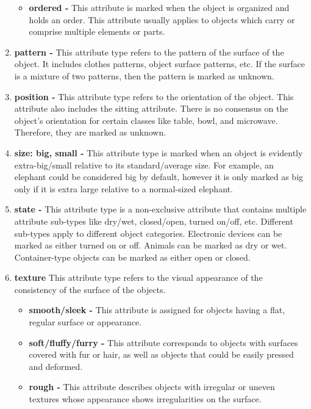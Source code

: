 \documentclass[10pt,twocolumn,letterpaper]{article}
\begin{document}
\begin{enumerate}
\begin{itemize}
        \item \textbf{ordered -} This attribute is marked when the object is organized and holds an order. This attribute usually applies to objects which carry or comprise multiple elements or parts. 
    \end{itemize}
       
\item \textbf{pattern -} This attribute type refers to the pattern of the surface of the object. It includes clothes patterns, object surface patterns, etc. If the surface is a mixture of two patterns, then the pattern is marked as unknown.
    
\item \textbf{position -} This attribute type refers to the orientation of the object. This attribute also includes the sitting attribute. There is no consensus on the object's orientation for certain classes like table, bowl, and microwave. Therefore, they are marked as unknown.
         
\item \textbf{size: big, small -} This attribute type is marked when an object is evidently extra-big/small relative to its standard/average size. For example, an elephant could be considered big by default, however it is only marked as big only if it is extra large relative to a normal-sized elephant.


\item \textbf{state -} This attribute type is a non-exclusive attribute that contains multiple attribute sub-types like dry/wet, closed/open, turned on/off, etc. Different sub-types apply to different object categories. Electronic devices can be marked as either turned on or off. Animals can be marked as dry or wet. Container-type objects can be marked as either open or closed. 
    
\item \textbf{texture} This attribute type refers to the visual appearance of the consistency of the surface of the objects. 
    \begin{itemize}
        \item \textbf{smooth/sleek -} This attribute is assigned for objects having a flat, regular surface or appearance.
        \item \textbf{soft/fluffy/furry -} This attribute corresponds to objects with surfaces covered with fur or hair, as well as objects that could be easily pressed and deformed.
        \item \textbf{rough -} This attribute describes objects with irregular or uneven textures whose appearance shows irregularities on the surface.
    \end{itemize}  
           

\end{enumerate}
\end{document}
